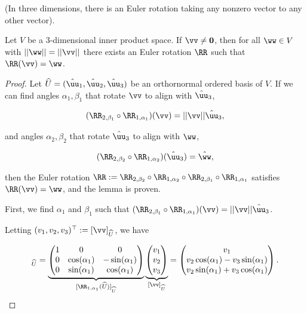 \begin{lemma}
    (In three dimensions, there is an Euler rotation taking any nonzero vector to any other vector).

    Let $V$ be a $3$-dimensional inner product space. If $\vv \neq \mathbf{0}$, then for all $\ww \in V$ with $||\ww|| = ||\vv||$ there exists an Euler rotation $\RR$ such that $\RR(\vv) = \ww$.
\end{lemma}

\begin{proof}
    Let $\hU = (\huu_1, \huu_2, \huu_3)$ be an orthornormal ordered basis of $V$. If we can find angles $\alpha_1, \beta_1$ that rotate $\vv$ to align with $\huu_3$,

    \begin{align*}
        (\RR_{2, \beta_1} \circ \RR_{1, \alpha_1})(\vv) = ||\vv||\huu_3,
    \end{align*}
    
    and angles $\alpha_2, \beta_2$ that rotate $\huu_3$ to align with $\ww$, 

    \begin{align*}
        (\RR_{2, \beta_2} \circ \RR_{1, \alpha_2})(\huu_3) = \hww,
    \end{align*}

    then the Euler rotation $\RR := \RR_{2, \beta_2} \circ \RR_{1, \alpha_2} \circ \RR_{2, \beta_1} \circ \RR_{1, \alpha_1}$ satisfies $\RR(\vv) = \ww$, and the lemma is proven.

    \vspace{.5cm}

    First, we find $\alpha_1$ and $\beta_1$ such that $(\RR_{2, \beta_1} \circ \RR_{1, \alpha_1})(\vv) = ||\vv||\huu_3$.

    Letting $(v_1, v_2, v_3)^\top := [\vv]_{\hU}$, we have
    
    \begin{align*}
        [\RR_{1, \alpha_1}(\vv)]_{\hU} =
        \underbrace
        {
            \begin{pmatrix}
                1 & 0 & 0 \\
                0 & \cos(\alpha_1) & -\sin(\alpha_1) \\
                0 & \sin(\alpha_1) & \cos(\alpha_1)
            \end{pmatrix}
        }_{[\RR_{1, \alpha_1}(\hU)]_{\hU}}
        \underbrace
        {
            \begin{pmatrix}
                v_1 \\ v_2 \\ v_3
            \end{pmatrix}
        }_{[\vv]_{\hU}}
        =
        \begin{pmatrix}
            v_1 \\
            v_2 \cos(\alpha_1) - v_3 \sin(\alpha_1) \\
            v_2 \sin(\alpha_1) + v_3 \cos(\alpha_1)
        \end{pmatrix}.
    \end{align*}


\end{proof}
